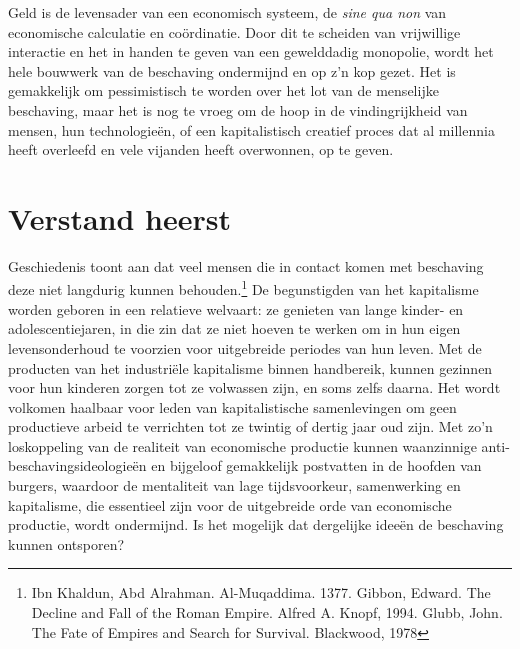 Geld is de levensader van een economisch systeem, de \emph{sine qua non} van economische calculatie en coördinatie. Door dit te scheiden van vrijwillige interactie en het in handen te geven van een gewelddadig monopolie, wordt het hele bouwwerk van de beschaving ondermijnd en op z'n kop gezet. Het is gemakkelijk om pessimistisch te worden over het lot van de menselijke beschaving, maar het is nog te vroeg om de hoop in de vindingrijkheid van mensen, hun technologieën, of een kapitalistisch creatief proces dat al millennia heeft overleefd en vele vijanden heeft overwonnen, op te
geven.

\hypertarget{verstand-heerst}{%
\section{Verstand heerst}\label{verstand-heerst}}

Geschiedenis toont aan dat veel mensen die in contact komen met beschaving deze niet langdurig kunnen behouden.\footnote{Ibn Khaldun, Abd Alrahman. Al-Muqaddima. 1377. Gibbon, Edward. The Decline and Fall of the Roman Empire. Alfred A. Knopf, 1994. Glubb, John. The Fate of Empires and Search for Survival. Blackwood, 1978} De begunstigden van het kapitalisme worden geboren in een relatieve welvaart: ze genieten van lange kinder- en adolescentiejaren, in die zin dat ze niet hoeven te werken om in hun eigen levensonderhoud te voorzien voor uitgebreide periodes van hun leven. Met de producten van het industriële kapitalisme binnen handbereik, kunnen gezinnen voor hun kinderen zorgen tot ze volwassen zijn, en soms zelfs daarna. Het wordt volkomen haalbaar voor leden van kapitalistische samenlevingen om geen productieve arbeid te verrichten tot ze twintig of dertig jaar oud zijn. Met zo’n loskoppeling van de realiteit van economische productie kunnen waanzinnige anti-beschavingsideologieën en bijgeloof gemakkelijk postvatten in de hoofden van burgers, waardoor de mentaliteit van lage tijdsvoorkeur, samenwerking en kapitalisme, die essentieel zijn voor de uitgebreide orde van economische productie, wordt ondermijnd. Is het mogelijk dat dergelijke ideeën de beschaving kunnen ontsporen?

